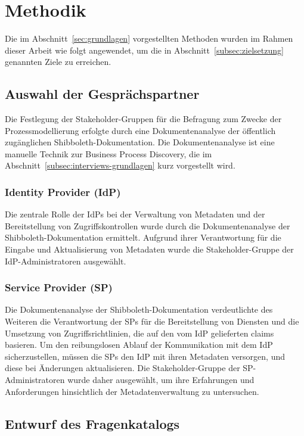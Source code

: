 
\section{Methodik}\label{sec:methodik}
Die im Abschnitt~\ref{sec:grundlagen} vorgestellten Methoden wurden im Rahmen dieser Arbeit wie folgt angewendet, um die in Abschnitt~\ref{subsec:zielsetzung} genannten Ziele zu erreichen.
\subsection{Auswahl der Gesprächspartner}\label{subsubsec:auswahl-gespraechspartner}
Die Festlegung der Stakeholder-Gruppen für die Befragung zum Zwecke der Prozessmodellierung erfolgte durch eine Dokumentenanalyse der öffentlich zugänglichen Shibboleth-Dokumentation. 
Die Dokumentenanalyse ist eine manuelle Technik zur Business Process Discovery, die im Abschnitt~\ref{subsec:interviews-grundlagen} kurz vorgestellt wird. 

\subsubsection{Identity Provider (IdP)}
Die zentrale Rolle der IdPs bei der Verwaltung von Metadaten und der Bereitstellung von Zugriffskontrollen wurde durch die Dokumentenanalyse der Shibboleth-Dokumentation ermittelt. 
Aufgrund ihrer Verantwortung für die Eingabe und Aktualisierung von Metadaten wurde die Stakeholder-Gruppe der IdP-Administratoren ausgewählt.

\subsubsection{Service Provider (SP)}
Die Dokumentenanalyse der Shibboleth-Dokumentation verdeutlichte des Weiteren die Verantwortung der SPs für die Bereitstellung von Diensten und die Umsetzung von Zugriffsrichtlinien, die auf den vom IdP gelieferten claims basieren.
Um den reibungslosen Ablauf der Kommunikation mit dem IdP sicherzustellen, müssen die SPs den IdP mit ihren Metadaten versorgen, und diese bei Änderungen aktualisieren.
Die Stakeholder-Gruppe der SP-Administratoren wurde daher ausgewählt, um ihre Erfahrungen und Anforderungen hinsichtlich der Metadatenverwaltung zu untersuchen.

\subsection{Entwurf des Fragenkatalogs}\label{subsubsec:entwurf-fragenkatalog}

